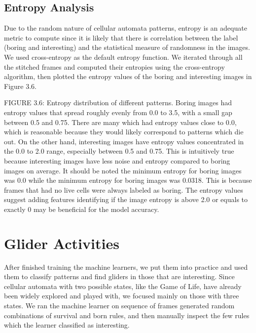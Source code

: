 \documentclass[12pt]{article}
\numberwithin{figure}{section} %
\begin{document}
\subsection{Entropy Analysis}
Due to the random nature of cellular automata patterns, entropy is an adequate metric to compute since it is likely that there is correlation between the label (boring and interesting) and the statistical measure of randomness in the images. We used cross-entropy as the default entropy function. We iterated through all the stitched frames and computed their entropies using the cross-entropy algorithm, then plotted the entropy values of the boring and interesting images in Figure 3.6. 
  
FIGURE 3.6: Entropy distribution of different patterns.
Boring images had entropy values that spread roughly evenly from 0.0 to 3.5, with a small gap between 0.5 and 0.75. There are many which had entropy values close to 0.0, which is reasonable because they would likely correspond to patterns which die out. On the other hand, interesting images have entropy values concentrated in the 0.0 to 2.0 range, especially between 0.5 and 0.75. This is intuitively true because interesting images have less noise and entropy compared to boring images on average. It should be noted the minimum entropy for boring images was 0.0 while the minimum entropy for boring images was 0.0318. This is because frames that had no live cells were always labeled as boring. The entropy values suggest adding features identifying if the image entropy is above 2.0 or equals to exactly 0 may be beneficial for the model accuracy. 

\newpage
\section{Glider Activities}
After finished training the machine learners, we put them into practice and used them to classify patterns and find gliders in those that are interesting. Since cellular automata with two possible states, like the Game of Life, have already been widely explored and played with, we focused mainly on those with three states. We ran the machine learner on sequence of frames generated random combinations of survival and born rules, and then manually inspect the few rules which the learner classified as interesting. 
\end{document}
